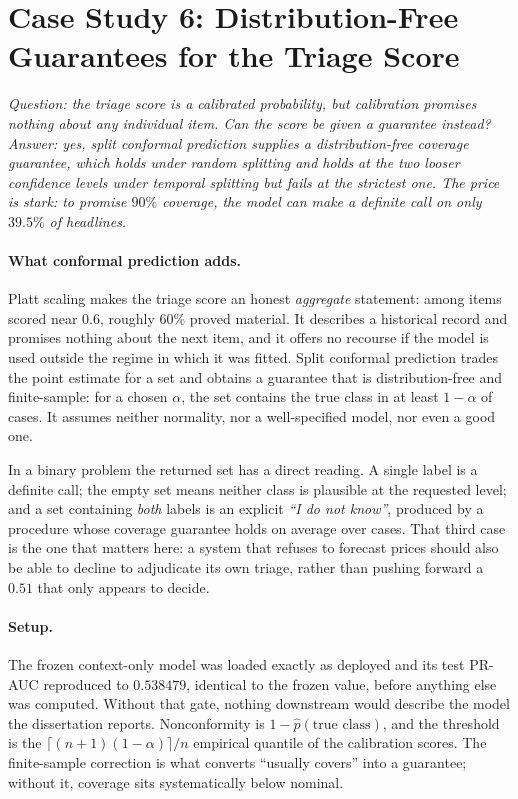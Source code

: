 \section{Case Study 6: Distribution-Free Guarantees for the Triage Score}
\label{sec:cs_conformal}

\emph{Question: the triage score is a calibrated probability, but calibration promises nothing about
any individual item. Can the score be given a guarantee instead? Answer: yes, split conformal
prediction supplies a distribution-free coverage guarantee, which holds under random splitting and
holds at the two looser confidence levels under temporal splitting but fails at the strictest one.
The price is stark: to promise $90\%$ coverage, the model can make a definite call on only $39.5\%$
of headlines.}

\paragraph{What conformal prediction adds.} Platt scaling makes the triage score an honest
\emph{aggregate} statement: among items scored near $0.6$, roughly $60\%$ proved material. It
describes a historical record and promises nothing about the next item, and it offers no recourse if
the model is used outside the regime in which it was fitted. Split conformal prediction trades the
point estimate for a set and obtains a guarantee that is distribution-free and finite-sample: for a
chosen $\alpha$, the set contains the true class in at least $1-\alpha$ of cases. It assumes neither
normality, nor a well-specified model, nor even a good one.

In a binary problem the returned set has a direct reading. A single label is a definite call; the
empty set means neither class is plausible at the requested level; and a set containing \emph{both}
labels is an explicit \emph{``I do not know''}, produced by a procedure whose coverage guarantee
holds on average over cases. That third case is the one
that matters here: a system that refuses to forecast prices should also be able to decline to
adjudicate its own triage, rather than pushing forward a $0.51$ that only appears to decide.

\paragraph{Setup.} The frozen context-only model was loaded exactly as deployed and its test PR-AUC
reproduced to $0.538479$, identical to the frozen value, before anything else was computed. Without
that gate, nothing downstream would describe the model the dissertation reports. Nonconformity is
$1-\hat{p}(\text{true class})$, and the threshold is the $\lceil (n+1)(1-\alpha)\rceil / n$ empirical
quantile of the calibration scores. The finite-sample correction is what converts ``usually covers''
into a guarantee; without it, coverage sits systematically below nominal.

